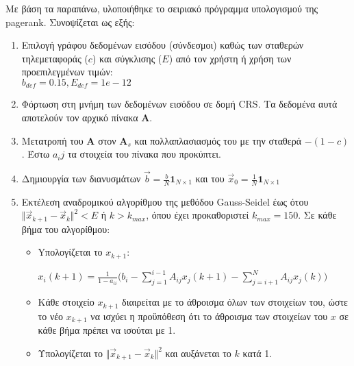 Με βάση τα παραπάνω, υλοποιήθηκε το σειριακό πρόγραμμα υπολογισμού της pagerank. Συνοψίζεται ως εξής:
\begin{enumerate}

\item Επιλογή γράφου δεδομένων εισόδου (σύνδεσμοι) καθώς των σταθερών τηλεμεταφοράς ($c$) και σύγκλισης ($E$) από τον χρήστη ή χρήση των προεπιλεγμένων τιμών: \\ $b_{def} = 0.15, E_{def} = 1e-12$

\item Φόρτωση στη μνήμη των δεδομένων εισόδου σε δομή CRS. Tα δεδομένα αυτά αποτελούν τον αρχικό πίνακα $\bm{A}$.

\item Μετατροπή του $\bm{A}$ στον $\bm{A}_s$ και πολλαπλασιασμός του με την σταθερά $-(1-c)$. Έστω $a_ij$ τα στοιχεία του πίνακα που προκύπτει.

\item Δημιουργία των διανυσμάτων $\vec{b}=\frac{b}{N}\bm{1}_{N\times1}$ και του $\vec{x}_0=\frac{1}{N}\bm{1}_{N\times1}$

\item Εκτέλεση αναδρομικού αλγορίθμου της μεθόδου Gauss-Seidel έως ότου $\Vert\vec{x}_{k+1}-\vec{x}_k\Vert^2 < E$ ή $k > k_{max}$, όπου έχει προκαθοριστεί $k_{max} = 150$.
Σε κάθε βήμα του αλγορίθμου:
\begin{itemize}[leftmargin=*]
\item Yπολογίζεται το $x_{k+1}$:

\hfil$\displaystyle x_i(k+1) = \frac{1}{1-a_{ii}}\bigg(b_i-\sum_{j=1}^{i-1}A_{ij}x_j(k+1)-\sum_{j=i+1}^{N}A_{ij}x_j(k)\bigg)$\hfil

\item Κάθε στοιχείο $x_{k+1}$ διαιρείται με το άθροισμα όλων των στοιχείων του, ώστε το νέο $x_{k+1}$ να ισχύει η προϋπόθεση ότι το άθροισμα των στοιχείων του $x$ σε κάθε βήμα πρέπει να ισούται με 1.

\item Υπολογίζεται το $\Vert\vec{x}_{k+1}-\vec{x}_k\Vert^2$ και αυξάνεται το $k$ κατά 1.

\end{itemize}
\end{enumerate}